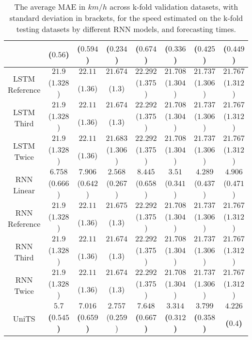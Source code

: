 \begin{table}[!ht]
{\begin{tabular}{|c|c|c|c|c|c|c|c|}
			 & ($0.56$) & ($0.594$) & \textbf{(}$\mathbf{0.234}$\textbf{)} & ($0.674$) & ($0.336$) & ($0.425$) & ($0.449$) \\ \hline
			\multirow{2}{*}{LSTM Reference} & $21.9$ & $22.11$ & $21.674$ & $22.292$ & $21.708$ & $21.737$ & $21.767$ \\
			 & ($1.328$) & ($1.36$) & ($1.3$) & ($1.375$) & ($1.304$) & ($1.306$) & ($1.312$) \\ \hline
			\multirow{2}{*}{LSTM Third} & $21.9$ & $22.11$ & $21.674$ & $22.292$ & $21.708$ & $21.737$ & $21.767$ \\
			 & ($1.328$) & ($1.36$) & ($1.3$) & ($1.375$) & ($1.304$) & ($1.306$) & ($1.312$) \\ \hline
			\multirow{2}{*}{LSTM Twice} & $21.9$ & $22.11$ & $21.683$ & $22.292$ & $21.708$ & $21.737$ & $21.767$ \\
			 & ($1.328$) & ($1.36$) & ($1.306$) & ($1.375$) & ($1.304$) & ($1.306$) & ($1.312$) \\ \hline
			\multirow{2}{*}{RNN Linear} & $6.758$ & $7.906$ & $2.568$ & $8.445$ & $3.51$ & $4.289$ & $4.906$ \\
			 & ($0.666$) & ($0.642$) & ($0.267$) & ($0.658$) & ($0.341$) & ($0.437$) & ($0.471$) \\ \hline
			\multirow{2}{*}{RNN Reference} & $21.9$ & $22.11$ & $21.675$ & $22.292$ & $21.708$ & $21.737$ & $21.767$ \\
			 & ($1.328$) & ($1.36$) & ($1.3$) & ($1.375$) & ($1.304$) & ($1.306$) & ($1.312$) \\ \hline
			\multirow{2}{*}{RNN Third} & $21.9$ & $22.11$ & $21.674$ & $22.292$ & $21.708$ & $21.737$ & $21.767$ \\
			 & ($1.328$) & ($1.36$) & ($1.3$) & ($1.375$) & ($1.304$) & ($1.306$) & ($1.312$) \\ \hline
			\multirow{2}{*}{RNN Twice} & $21.9$ & $22.11$ & $21.674$ & $22.292$ & $21.708$ & $21.737$ & $21.767$ \\
			 & ($1.328$) & ($1.36$) & ($1.3$) & ($1.375$) & ($1.304$) & ($1.306$) & ($1.312$) \\ \hline
			\multirow{2}{*}{UniTS} & $\mathbf{5.7}$ & $\mathbf{7.016}$ & $2.757$ & $\mathbf{7.648}$ & $\mathbf{3.314}$ & $\mathbf{3.799}$ & $\mathbf{4.226}$ \\
			 & \textbf{(}$\mathbf{0.545}$\textbf{)} & \textbf{(}$\mathbf{0.659}$\textbf{)} & ($0.259$) & \textbf{(}$\mathbf{0.667}$\textbf{)} & \textbf{(}$\mathbf{0.312}$\textbf{)} & \textbf{(}$\mathbf{0.358}$\textbf{)} & \textbf{(}$\mathbf{0.4}$\textbf{)} \\ \hline
		\end{tabular}
	}
	\caption{The average MAE in $km/h$ across k-fold validation datasets, with standard deviation in brackets, for the speed estimated on the k-fold testing datasets by different RNN models, and forecasting times.}
	\label{tab:all_speed_MAE}
\end{table}

